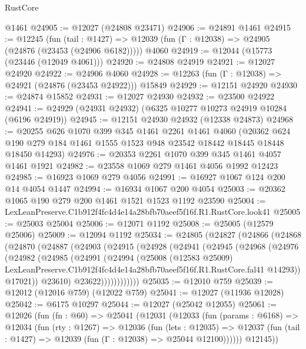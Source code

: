 \begin{lexlean}{RustCore}
\begin{coremodule}
    @1461
@24905 := @12027 (@24808 @23471)
@24906 := @24891 @1461
@24915 := @12245
    (fun (tail : @1427) => @12039 (fun (Γ : @12038) => @24905 (@24876 (@23453 (@24906 @6182)))))
    @4060
@24919 := @12044 (@15773 (@23446 (@12049 @4061)))
@24920 := @24808 @24919
@24921 := @12027 @24920
@24922 := @24906 @4060
@24928 := @12263 (fun (Γ : @12038) => @24921 (@24876 (@23453 @24922))) @15849
@24929 := @12151 @24920
@24930 := @24874 @15852
@24931 := @12027 @24930
@24932 := @23500 @24922
@24941 := @24929 (@24931 @24932) (@6325 @10277 @10273 @24919 @10284 (@6196 @24919))
@24945 := @12151 @24930 @24932 (@12338 @24873)
@24968 := @20255
    @626
    @1070
    @399
    @345
    @1461
    @2261
    @1461
    @4060
    (@20362 @624 @190 @279 @184 @1461 @1555 @1523 @948 @23542 @18442 @18445 @18448 @18450 @14293)
@24976 := @20353 @2261 @1070 @399 @345 @1461 @4057 @1461 @1921
@24982 := @23558 @1069 @279 @1461 @4056 @1992 @12423
@24985 := @16923 @1069 @279 @4056
@24991 := @16927 @1067 @124 @200 @14 @4054 @1447
@24994 := @16934 @1067 @200 @4054
@25003 := @20362 @1065 @190 @279 @200 @1461 @1521 @1523 @1192 @23590
@25004 := LexLeanPreserve.C1b912f4fc4d4e14a28bfb70aeef5f16f.R1.RustCore.look41
@25005 := @25003 @25004
@25006 := @12071 @1192
@25008 := @25005 (@12579 @25006)
@25009 := @12094 @1192
@25034 := @24805
    (@24827
      (@24866
        (@24868
          (@24870
            (@24887
              (@24903
                (@24915
                  (@24928
                    (@24941
                      (@24945
                        (@24968
                          (@24976
                            (@24982
                              (@24985
                                (@24991
                                  (@24994
                                    (@25008
                                      (@12583 @25009)
                                      LexLeanPreserve.C1b912f4fc4d4e14a28bfb70aeef5f16f.R1.RustCore.fal41
                                      @14293))
                                  @17021))
                              @23610)
                            @23622))))))))))))
@25035 := @12010 @759
@25039 := @12012 (@12016 @759) (@12022 @759)
@25041 := @12027 (@11936 @12028)
@25042 := @6175 @10297
@25044 := @12027 (@25042 @12055)
@25061 := @12026
    (fun (fn : @60) =>
    @25041
      (@12031
        (@12033
          (fun (params : @6168) =>
          @12034
            (fun (rty : @1267) =>
            @12036
              (fun (lets : @12035) =>
              @12037 (fun (tail : @1427) => @12039 (fun (Γ : @12038) => @25044 @12100))))))
        @12145))

\end{coremodule}
\end{lexlean}
